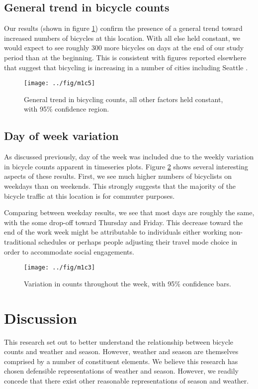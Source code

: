 \documentclass[12pt,letterpaper,article,twocolumn]{memoir}
\begin{document}
\FloatBarrier
\subsection*{General trend in bicycle counts}
Our results (shown in figure \ref{fg:trend}) confirm the presence of a
general trend toward increased numbers of bicycles at this location.
With all else held constant, we would expect to see roughly 300 more
bicycles on days at the end of our study period than at the beginning.
This is consistent with figures reported elsewhere that suggest that
bicycling is increasing in a number of cities including
Seattle \parencite{League-of-American-Bicyclists:aa}.

\begin{figure}[ht!]
  \centering
  \texttt{[image: ../fig/m1c5]}
  \caption{General trend in bicycling counts, all other factors held
    constant, with 95\% confidence region.}
  \label{fg:trend}
\end{figure}


\FloatBarrier
\subsection*{Day of week variation}
As discussed previously, day of the week was included due to the
weekly variation in bicycle counts apparent in timeseries plots.
Figure \ref{fg:dayofweek} shows several interesting aspects of these
results. First, we see much higher numbers of bicyclists on weekdays
than on weekends. This strongly suggests that the majority of the
bicycle traffic at this location is for commuter purposes.

Comparing between weekday results, we see that most days are roughly
the same, with the some drop-off toward Thursday and Friday. This
decrease toward the end of the work week might be attributable to
individuals either working non-traditional schedules or perhaps people
adjusting their travel mode choice in order to accommodate social
engagements.

\begin{figure}[ht!]
  \centering
  \texttt{[image: ../fig/m1c3]}
  \caption{Variation in counts throughout the week, with 95\% confidence bars.}
  \label{fg:dayofweek}
\end{figure}

\FloatBarrier
\section*{Discussion}
This research set out to better understand the relationship between
bicycle counts and weather and season. However, weather and season are
themselves comprised by a number of constituent elements. We believe
this research has chosen defensible representations of weather and
season. However, we readily concede that there exist other reasonable
representations of season and weather.
\end{document}
